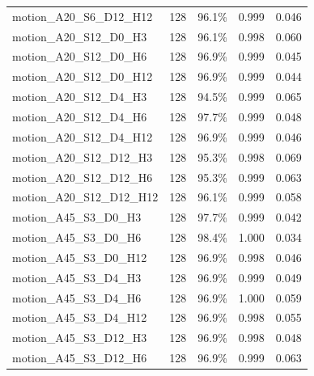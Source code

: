 \documentclass[11pt]{article}
\begin{document}
\begin{longtable}{p{}rrrr}
motion\_\allowbreak{}A20\_\allowbreak{}S6\_\allowbreak{}D12\_\allowbreak{}H12 & 128 & 96.1\% & 0.999 & 0.046\\
motion\_\allowbreak{}A20\_\allowbreak{}S12\_\allowbreak{}D0\_\allowbreak{}H3 & 128 & 96.1\% & 0.998 & 0.060\\
motion\_\allowbreak{}A20\_\allowbreak{}S12\_\allowbreak{}D0\_\allowbreak{}H6 & 128 & 96.9\% & 0.999 & 0.045\\
motion\_\allowbreak{}A20\_\allowbreak{}S12\_\allowbreak{}D0\_\allowbreak{}H12 & 128 & 96.9\% & 0.999 & 0.044\\
motion\_\allowbreak{}A20\_\allowbreak{}S12\_\allowbreak{}D4\_\allowbreak{}H3 & 128 & 94.5\% & 0.999 & 0.065\\
motion\_\allowbreak{}A20\_\allowbreak{}S12\_\allowbreak{}D4\_\allowbreak{}H6 & 128 & 97.7\% & 0.999 & 0.048\\
motion\_\allowbreak{}A20\_\allowbreak{}S12\_\allowbreak{}D4\_\allowbreak{}H12 & 128 & 96.9\% & 0.999 & 0.046\\
motion\_\allowbreak{}A20\_\allowbreak{}S12\_\allowbreak{}D12\_\allowbreak{}H3 & 128 & 95.3\% & 0.998 & 0.069\\
motion\_\allowbreak{}A20\_\allowbreak{}S12\_\allowbreak{}D12\_\allowbreak{}H6 & 128 & 95.3\% & 0.999 & 0.063\\
motion\_\allowbreak{}A20\_\allowbreak{}S12\_\allowbreak{}D12\_\allowbreak{}H12 & 128 & 96.1\% & 0.999 & 0.058\\
motion\_\allowbreak{}A45\_\allowbreak{}S3\_\allowbreak{}D0\_\allowbreak{}H3 & 128 & 97.7\% & 0.999 & 0.042\\
motion\_\allowbreak{}A45\_\allowbreak{}S3\_\allowbreak{}D0\_\allowbreak{}H6 & 128 & 98.4\% & 1.000 & 0.034\\
motion\_\allowbreak{}A45\_\allowbreak{}S3\_\allowbreak{}D0\_\allowbreak{}H12 & 128 & 96.9\% & 0.998 & 0.046\\
motion\_\allowbreak{}A45\_\allowbreak{}S3\_\allowbreak{}D4\_\allowbreak{}H3 & 128 & 96.9\% & 0.999 & 0.049\\
motion\_\allowbreak{}A45\_\allowbreak{}S3\_\allowbreak{}D4\_\allowbreak{}H6 & 128 & 96.9\% & 1.000 & 0.059\\
motion\_\allowbreak{}A45\_\allowbreak{}S3\_\allowbreak{}D4\_\allowbreak{}H12 & 128 & 96.9\% & 0.998 & 0.055\\
motion\_\allowbreak{}A45\_\allowbreak{}S3\_\allowbreak{}D12\_\allowbreak{}H3 & 128 & 96.9\% & 0.998 & 0.048\\
motion\_\allowbreak{}A45\_\allowbreak{}S3\_\allowbreak{}D12\_\allowbreak{}H6 & 128 & 96.9\% & 0.999 & 0.063\\

\end{longtable}
\end{document}

